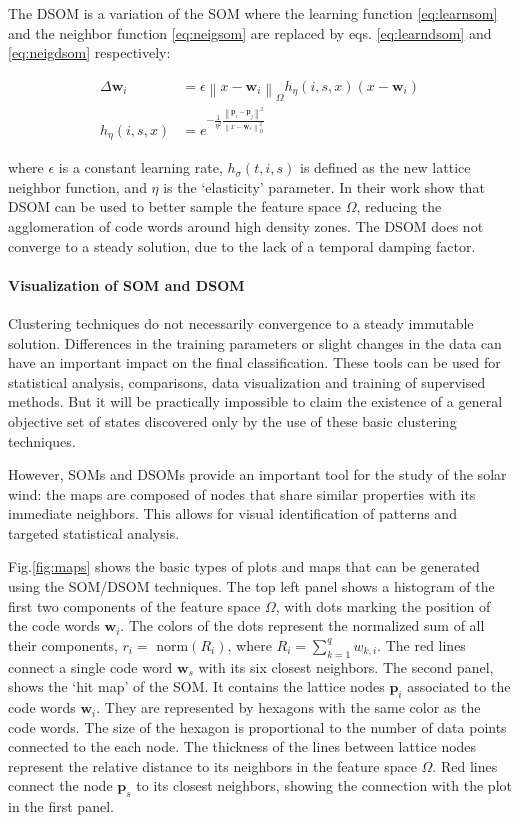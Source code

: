 The DSOM is a variation of the SOM where the learning function \eqref{eq:learnsom} and the neighbor function \eqref{eq:neigsom} are replaced by eqs. \eqref{eq:learndsom} and \eqref{eq:neigdsom} respectively:

\begin{align}
\Delta \boldsymbol{w}_i & = \epsilon \left\lVert x - \boldsymbol{w}_i \right\rVert_\Omega h_\eta(i,s,x)(x-\boldsymbol{w}_i) \label{eq:learndsom} \\
h_\eta(i,s,x) & = e^{-\frac{1}{\eta^2}\frac{\left\lVert \boldsymbol{p}_i - \boldsymbol{p}_j \right\rVert^2}{\left\lVert x - \boldsymbol{w}_s \right\rVert_\Omega^2}} \label{eq:neigdsom} 
\end{align}

where $\epsilon$ is a constant learning rate, $h_\sigma(t,i,s)$ is defined as the new lattice neighbor function, and $\eta$ is the `elasticity' parameter. In their work \citep{Rougier2011} show that DSOM can be used to better sample the feature space $\Omega$, reducing the agglomeration of code words around high density zones. The DSOM does not converge to a steady solution, due to the lack of a temporal damping factor.

\paragraph{Visualization of SOM and DSOM}
Clustering techniques do not necessarily convergence to a steady immutable solution. Differences in the training parameters or slight changes in the data can have an important impact on the final classification. These tools can be used for statistical analysis, comparisons, data visualization and training of supervised methods. But it will be practically impossible to claim the existence of a general objective set of states discovered only by the use of these basic clustering techniques.

However, SOMs and DSOMs provide an important tool for the study of the solar wind: the maps are composed of nodes that share similar properties with its immediate neighbors. This allows for visual identification of patterns and targeted statistical analysis.

Fig.\ref{fig:maps} shows the basic types of plots and maps that can be generated using the SOM/DSOM techniques. The top left panel shows a histogram of the first two components of the feature space $\Omega$, with dots marking the position of the code words $\boldsymbol{w}_i$. The colors of the dots represent the normalized sum of all their components, $r_i =$ norm$(R_i)$, where $R_i = \sum_{k=1}^q w_{k,i}$. The red lines connect a single code word $\boldsymbol{w}_s$ with its six closest neighbors. The second panel, shows the `hit map' of the SOM. It contains the lattice nodes $\boldsymbol{p}_i$ associated to the code words $\boldsymbol{w}_i$. They are represented by hexagons with the same color as the code words. The size of the hexagon is proportional to the number of data points connected to the each node. The thickness of the lines between lattice nodes represent the relative distance to its neighbors in the feature space $\Omega$. Red lines connect the node $\boldsymbol{p}_s$ to its closest neighbors, showing the connection with the plot in the first panel.

